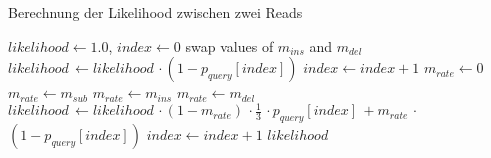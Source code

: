 \begin{algorithm}[H]
	\caption{Berechnung der Likelihood zwischen zwei Reads}  \label{alg:lh_read}
	\begin{algorithmic}[1]	
		\State $ likelihood \gets 1.0 $, $ index \gets 0 $
		    \State swap values of $ m_{ins} $ and $ m_{del} $
	    \EndIf
		        \State $ likelihood\, \gets likelihood \,\cdotp (1-p_{query}[index]) $
		    	\State $ index \gets index + 1 $
		    \EndWhile
	    \EndIf
	        \State $ m_{rate} \gets 0 $
	            \State $ m_{rate} \gets m_{sub} $
	        \EndIf
	            \State $ m_{rate} \gets m_{ins} $
	        \EndIf
	            \State $ m_{rate} \gets m_{del} $
	        \EndIf
		        \State $ likelihood\, \gets likelihood \,\cdotp (1 - m_{rate})\,\cdotp \frac{1}{3} \,\cdotp p_{query}[index] \, +  m_{rate}\,\cdotp $         
		         \State \hspace{63pt}  $ (1 - p_{query}[index]) $ 		        
		        \State $ index \gets index + 1 $
	        \EndWhile
	    \EndIf
		\EndFor
		\State \Return $likelihood$
		\EndFunction		
	\end{algorithmic}
\end{algorithm}

